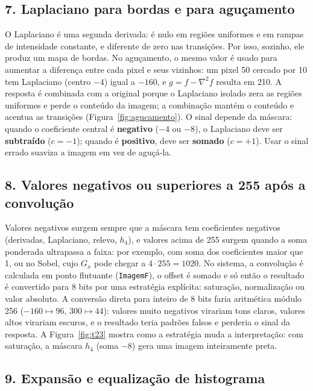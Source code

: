 \documentclass[11pt,a4paper]{article}
\begin{document}
\subsection*{7. Laplaciano para bordas e para aguçamento}

O Laplaciano é uma segunda derivada: é nulo em regiões uniformes e em rampas de intensidade
constante, e diferente de zero nas transições. Por isso, sozinho, ele produz um mapa de bordas.
No aguçamento, o mesmo valor é usado para aumentar a diferença entre cada pixel e seus vizinhos:
um pixel 50 cercado por 10 tem Laplaciano (centro $-4$) igual a $-160$, e $g = f - \nabla^2 f$
resulta em 210. A resposta é combinada com a original porque o Laplaciano isolado zera as
regiões uniformes e perde o conteúdo da imagem; a combinação mantém o conteúdo e acentua as
transições (Figura~\ref{fig:agucamento}). O sinal depende da máscara: quando o coeficiente
central é \textbf{negativo} ($-4$ ou $-8$), o Laplaciano deve ser \textbf{subtraído}
($c = -1$); quando é \textbf{positivo}, deve ser \textbf{somado} ($c = +1$). Usar o sinal errado
suaviza a imagem em vez de aguçá-la.

\subsection*{8. Valores negativos ou superiores a 255 após a convolução}

Valores negativos surgem sempre que a máscara tem coeficientes negativos (derivadas, Laplaciano,
relevo, $h_4$), e valores acima de 255 surgem quando a soma ponderada ultrapassa a faixa: por
exemplo, com soma dos coeficientes maior que 1, ou no Sobel, cujo $G_x$ pode chegar a
$4 \cdot 255 = 1020$. No sistema, a convolução é calculada em ponto flutuante
(\texttt{ImagemF}), o offset é somado e só então o resultado é convertido para 8 bits por uma
estratégia explícita: saturação, normalização ou valor absoluto. A conversão direta para inteiro
de 8 bits faria aritmética módulo 256 ($-160 \mapsto 96$, $300 \mapsto 44$): valores muito
negativos virariam tons claros, valores altos virariam escuros, e o resultado teria padrões
falsos e perderia o sinal da resposta. A Figura~\ref{fig:t23} mostra como a estratégia muda a
interpretação: com saturação, a máscara $h_4$ (soma $-8$) gera uma imagem inteiramente preta.

\subsection*{9. Expansão e equalização de histograma}
\end{document}
